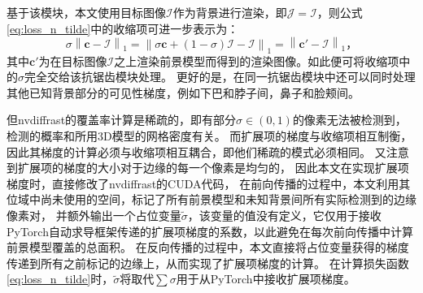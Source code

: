 基于该模块，本文使用目标图像$\mathcal{I}$作为背景进行渲染，即$\mathcal{J}=\mathcal{I}$，则公式\eqref{eq:loss_n_tilde}中的收缩项可进一步表示为：
\begin{equation}
\sigma\left\| \mathbf{c} - \mathcal{I} \right\|_1 =
\left\| \sigma\mathbf{c} + (1-\sigma)\mathcal{I} - \mathcal{I} \right\|_1 =
\left\| \mathbf{c}' - \mathcal{I} \right\|_1
\text{，}
\label{eq:impl_nvdiffrast}
\end{equation}
其中$\mathbf{c}'$为在目标图像$\mathcal{I}$之上渲染前景模型而得到的渲染图像。如此便可将收缩项中的$\sigma$完全交给该抗锯齿模块处理。
更好的是，在同一抗锯齿模块中还可以同时处理其他已知背景部分的可见性梯度，例如下巴和脖子间，鼻子和脸颊间。

但nvdiffrast的覆盖率计算是稀疏的，即有部分$\sigma\in(0,1)$的像素无法被检测到，检测的概率和所用3D模型的网格密度有关。
而扩展项的梯度与收缩项相互制衡，因此其梯度的计算必须与收缩项相互耦合，即他们稀疏的模式必须相同。
又注意到扩展项的梯度的大小对于边缘的每一个像素是均匀的，%
因此本文在实现扩展项梯度时，直接修改了nvdiffrast的CUDA代码，
在前向传播的过程中，本文利用其位域中尚未使用的空间，标记了所有前景模型和未知背景间所有实际检测到的边缘像素对，
并额外输出一个占位变量$\tilde{\sigma}$，该变量的值没有定义，它仅用于接收PyTorch自动求导框架传递的扩展项梯度的系数，以此避免在每次前向传播中计算前景模型覆盖的总面积。
在反向传播的过程中，本文直接将占位变量获得的梯度传递到所有之前标记的边缘上，从而实现了扩展项梯度的计算。
在计算损失函数\eqref{eq:loss_n_tilde}时，$\tilde{\sigma}$将取代$\sum\sigma$用于从PyTorch中接收扩展项梯度。

